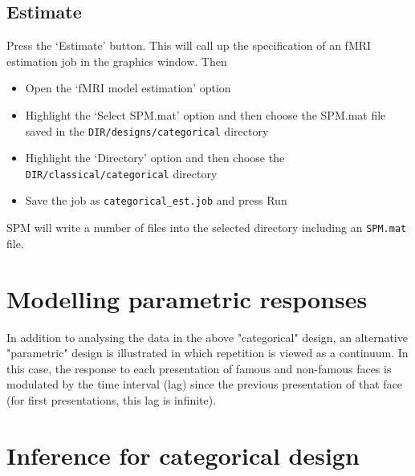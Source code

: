 \documentclass[a4paper,titlepage]{book}
\newcommand{\bi}{\begin{itemize}}
\newcommand{\ei}{\end{itemize}}
\begin{document}
\subsection{Estimate}

Press the `Estimate' button. This will call up the specification of an fMRI estimation job in the graphics window. Then
\bi
\item{Open the `fMRI model estimation' option}
\item{Highlight the `Select SPM.mat' option and then choose the SPM.mat
file saved in the \verb!DIR/designs/categorical! directory}
\item{Highlight the `Directory' option and then choose the 
\verb!DIR/classical/categorical! directory}
\item{Save the job as \verb!categorical_est.job! and press Run}
\ei
SPM will write a number of files into the selected directory including 
an \verb!SPM.mat! file.



\section{Modelling parametric responses}

In addition to analysing the data in the above "categorical" design, an alternative "parametric" design is illustrated in which repetition is viewed as a continuum. In this case, the response to each presentation of famous and non-famous faces is modulated by the time interval (lag) since the previous presentation of that face (for first presentations, this lag is infinite). 

\section{Inference for categorical design}
\end{document}
